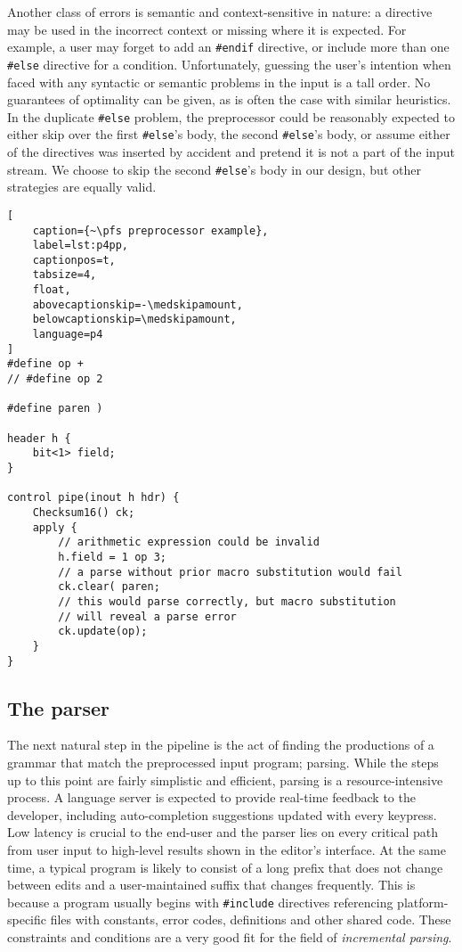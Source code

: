 Another class of errors is semantic and context-sensitive in nature: a directive
may be used in the incorrect context or missing where it is expected. For
example, a user may forget to add an \texttt{\#endif} directive, or include more
than one \texttt{\#else} directive for a condition. Unfortunately, guessing the
user's intention when faced with any syntactic or semantic problems in the input
is a tall order. No guarantees of optimality can be given, as is often the case
with similar heuristics. In the duplicate \texttt{\#else} problem, the
preprocessor could be reasonably expected to either skip over the first
\texttt{\#else}'s body, the second \texttt{\#else}'s body, or assume either of
the directives was inserted by accident and pretend it is not a part of the
input stream. We choose to skip the second \texttt{\#else}'s body in our design,
but other strategies are equally valid.

\begin{lstlisting}[
	caption={~\pfs preprocessor example},
	label=lst:p4pp,
	captionpos=t,
	tabsize=4,
	float,
	abovecaptionskip=-\medskipamount,
	belowcaptionskip=\medskipamount,
	language=p4
]
#define op +
// #define op 2

#define paren )

header h {
	bit<1> field;
}

control pipe(inout h hdr) {
	Checksum16() ck;
	apply {
		// arithmetic expression could be invalid
		h.field = 1 op 3;
		// a parse without prior macro substitution would fail
		ck.clear( paren;
		// this would parse correctly, but macro substitution
		// will reveal a parse error
		ck.update(op);
	}
}
\end{lstlisting}


\subsection{The parser}

The next natural step in the pipeline is the act of finding the productions of a
\pfs grammar that match the preprocessed input program; parsing. While the steps
up to this point are fairly simplistic and efficient, parsing is a
resource-intensive process. A language server is expected to provide real-time
feedback to the developer, including auto-completion suggestions updated with
every keypress. Low latency is crucial to the end-user and the parser lies on
every critical path from user input to high-level results shown in the editor's
interface. At the same time, a typical \pfs program is likely to consist of a
long prefix that does not change between edits and a user-maintained suffix that
changes frequently. This is because a \pfs program usually begins with
\texttt{\#include} directives referencing platform-specific files with
constants, error codes, \extern{} definitions and other shared code. These
constraints and conditions are a very good fit for the field of
\emph{incremental parsing}.

